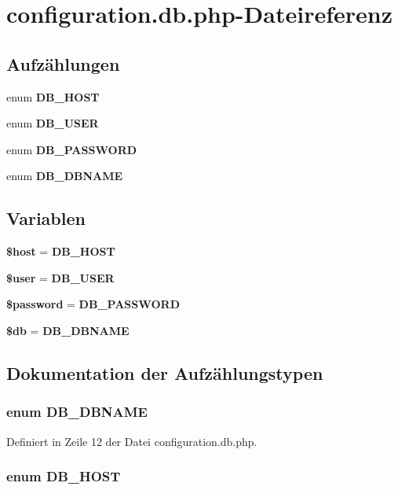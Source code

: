 \section{configuration.db.php-Dateireferenz}
\label{configuration_8db_8php}
\subsection*{Aufzählungen}
\begin{CompactItemize}
\item 
enum {\bf DB\_\-HOST} 
\item 
enum {\bf DB\_\-USER} 
\item 
enum {\bf DB\_\-PASSWORD} 
\item 
enum {\bf DB\_\-DBNAME} 
\end{CompactItemize}
\subsection*{Variablen}
\begin{CompactItemize}
\item 
{\bf \$host} = {\bf DB\_\-HOST}
\item 
{\bf \$user} = {\bf DB\_\-USER}
\item 
{\bf \$password} = {\bf DB\_\-PASSWORD}
\item 
{\bf \$db} = {\bf DB\_\-DBNAME}
\end{CompactItemize}


\subsection{Dokumentation der Aufzählungstypen}
\subsubsection{\setlength{\rightskip}{0pt plus 5cm}enum {\bf DB\_\-DBNAME}}\label{configuration_8db_8php_6dbd8ae5a56f665135b8c16a9d7bdc29}




Definiert in Zeile 12 der Datei configuration.db.php.
\subsubsection{\setlength{\rightskip}{0pt plus 5cm}enum {\bf DB\_\-HOST}}\label{configuration_8db_8php_c91a4a68860d6443b4af3115b80fe5c4}




